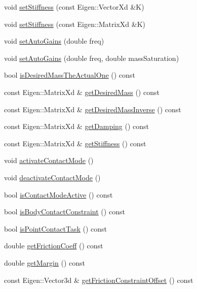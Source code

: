 \begin{DoxyCompactItemize}
\item 
void \hyperlink{classocra_1_1Task_ad4718bcc82babf0a8213740f35fce89c}{set\+Stiffness} (const Eigen\+::\+Vector\+Xd \&K)
\item 
void \hyperlink{classocra_1_1Task_aaa28b24df746182c2288a94fde03c37e}{set\+Stiffness} (const Eigen\+::\+Matrix\+Xd \&K)
\item 
void \hyperlink{classocra_1_1Task_a6d2b2b67112b1368c8bfd7e0ee8e2a0b}{set\+Auto\+Gains} (double freq)
\item 
void \hyperlink{classocra_1_1Task_a310fb246ea58d09d51af965a96d6a628}{set\+Auto\+Gains} (double freq, double mass\+Saturation)
\item 
bool \hyperlink{classocra_1_1Task_a3eebcc1acbafc633b36c83761973e09b}{is\+Desired\+Mass\+The\+Actual\+One} () const
\item 
const Eigen\+::\+Matrix\+Xd \& \hyperlink{classocra_1_1Task_a691db27f3868220469a8ce15a6a15817}{get\+Desired\+Mass} () const
\item 
const Eigen\+::\+Matrix\+Xd \& \hyperlink{classocra_1_1Task_ac6bca4c315c331f91dfc927aea4abbc2}{get\+Desired\+Mass\+Inverse} () const
\item 
const Eigen\+::\+Matrix\+Xd \& \hyperlink{classocra_1_1Task_a2842e5002ee9a517125ef8f154697c1b}{get\+Damping} () const
\item 
const Eigen\+::\+Matrix\+Xd \& \hyperlink{classocra_1_1Task_a4aa13d0dbdd46774ca02dcd220a5bfc4}{get\+Stiffness} () const
\item 
void \hyperlink{classocra_1_1Task_ab4ad2ba0aaf593bfdc8f78b30b730786}{activate\+Contact\+Mode} ()
\item 
void \hyperlink{classocra_1_1Task_a44fd1aaa1632247ea359af341958c956}{deactivate\+Contact\+Mode} ()
\item 
bool \hyperlink{classocra_1_1Task_ac642e15ebcd4ad00b58b27fe180d49eb}{is\+Contact\+Mode\+Active} () const
\item 
bool \hyperlink{classocra_1_1Task_addb2196431d746d26c208a91d4f0d003}{is\+Body\+Contact\+Constraint} () const
\item 
bool \hyperlink{classocra_1_1Task_ac45a4479fbec48fdc0e4ea1ed5ffbd4c}{is\+Point\+Contact\+Task} () const
\item 
double \hyperlink{classocra_1_1Task_a2f4d01238f3216ad6d837de99fb5a09b}{get\+Friction\+Coeff} () const
\item 
double \hyperlink{classocra_1_1Task_ae12d06cba3048edf3fc2ba86f61e23b6}{get\+Margin} () const
\item 
const Eigen\+::\+Vector3d \& \hyperlink{classocra_1_1Task_ae608885a660ae09ad80e85f7505a0dcb}{get\+Friction\+Constraint\+Offset} () const

\end{DoxyCompactItemize}
